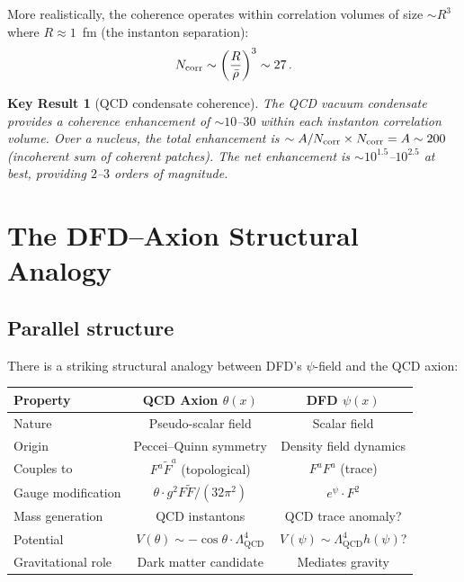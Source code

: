 \documentclass[aps,prd,twocolumn,superscriptaddress,floatfix,nofootinbib]{revtex4-2}
\newcommand{\LQCD}{\Lambda_{\mathrm{QCD}}}
\newtheorem{result}{Key Result}
\begin{document}
More realistically, the coherence operates within correlation volumes of size
$\sim R^3$ where $R \approx 1$~fm (the instanton separation):
\begin{equation}
N_{\rm corr} \sim \left(\frac{R}{\bar{\rho}}\right)^3 \sim 27 \, .
\end{equation}

\begin{result}[QCD condensate coherence]
The QCD vacuum condensate provides a coherence enhancement of $\sim 10$--$30$
within each instanton correlation volume. Over a nucleus, the total enhancement
is $\sim A/N_{\rm corr} \times N_{\rm corr} = A \sim 200$ (incoherent sum of
coherent patches). The net enhancement is $\sim 10^{1.5}$--$10^{2.5}$ at best,
providing $2$--$3$ orders of magnitude.
\end{result}


\section{The DFD--Axion Structural Analogy}
\label{sec:axion}

\subsection{Parallel structure}

There is a striking structural analogy between DFD's $\psi$-field and the QCD
axion:

\begin{center}
\begin{tabular}{lcc}
\toprule
\textbf{Property} & \textbf{QCD Axion $\theta(x)$} & \textbf{DFD $\psi(x)$} \\
\midrule
Nature & Pseudo-scalar field & Scalar field \\
Origin & Peccei--Quinn symmetry & Density field dynamics \\
Couples to & $F^a \tilde{F}^a$ (topological) & $F^a F^a$ (trace) \\
Gauge modification & $\theta \cdot g^2 F\tilde{F}/(32\pi^2)$ & $e^\psi \cdot F^2$ \\
Mass generation & QCD instantons & QCD trace anomaly? \\
Potential & $V(\theta) \sim -\cos\theta \cdot \LQCD^4$ & $V(\psi) \sim
\LQCD^4 h(\psi)$? \\
Gravitational role & Dark matter candidate & Mediates gravity \\
\bottomrule
\end{tabular}
\end{center}
\end{document}
